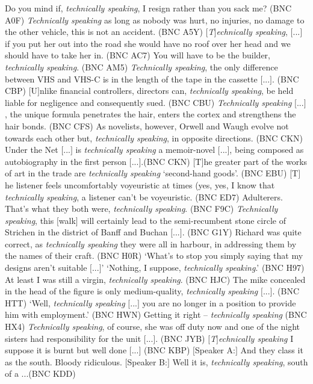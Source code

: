 \begin{exe}
\ex
\begin{xlist}
\label{ex:technicallyspeaking}
\ex Do you mind if, \textit{technically speaking}, I resign rather than you sack me? (BNC A0F) %
\ex \textit{Technically speaking} as long as nobody was hurt, no injuries, no damage to the other vehicle, this is not an accident. (BNC A5Y) %
\ex \textit{$[$T$]$echnically speaking}, $[$...$]$ if you put her out into the road she would have no roof over her head and we should have to take her in. \footnotesize{(BNC AC7)} %
\ex You will have to be the builder, \textit{technically speaking}. (BNC AM5) %
\ex \textit{Technically speaking}, the only difference between VHS and VHS-C is in the length of the tape in the cassette $[$...$]$. (BNC CBP) %
\ex $[$U$]$nlike financial controllers, directors can, \textit{technically speaking}, be held liable for negligence and consequently sued. (BNC CBU) %
\ex \textit{Technically speaking} $[$...$]$, the unique formula penetrates the hair, enters the cortex and strengthens the hair bonds. (BNC CFS) %
\ex As novelists, however, Orwell and Waugh evolve not towards each other but, \textit{technically speaking}, in opposite directions. (BNC CKN) %
\ex Under the Net $[$...$]$ is \textit{technically speaking} a memoir-novel $[$...$]$, being composed as autobiography in the first person $[$...$]$.(BNC CKN) %
\ex $[$T$]$he greater part of the works of art in the trade are \textit{technically speaking} `second-hand goods'. (BNC EBU) %
\ex $[$T$]$he listener feels uncomfortably voyeuristic at times (yes, yes, I know that \textit{technically speaking}, a listener can't be voyeuristic. (BNC ED7) %
\ex Adulterers. That's what they both were, \textit{technically speaking}. \footnotesize{(BNC F9C)} %
\ex \textit{Technically speaking}, this $[$walk$]$ will certainly lead to the semi\hyp{}recumbent stone circle of Strichen in the district of Banff and Buchan $[$...$]$. (BNC G1Y) %
\ex Richard was quite correct, as \textit{technically speaking} they were all in harbour, in addressing them by the names of their craft. (BNC H0R) %
\ex `What's to stop you simply saying that my designs aren't suitable $[$...$]$' `Nothing, I suppose, \textit{technically speaking}.' (BNC H97) %
\ex At least I was still a virgin, \textit{technically speaking}. (BNC HJC) %
\ex The mike concealed in the head of the figure is only medium-quality, \textit{technically speaking} $[$...$]$. (BNC HTT) %
\ex `Well, \textit{technically speaking} $[$...$]$ you are no longer in a position to provide him with employment.' (BNC HWN) %
\ex Getting it right -- \textit{technically speaking} (BNC HX4) %
\ex \textit{Technically speaking}, of course, she was off duty now and one of the night sisters had responsibility for the unit $[$...$]$. (BNC JYB) %
\ex \textit{$[$T$]$echnically speaking} I suppose it is burnt but well done $[$...$]$ \footnotesize{(BNC KBP)} %
\ex $[$Speaker A:$]$ And they class it as the south. Bloody ridiculous. $[$Speaker B:$]$ Well it is, \textit{technically speaking}, south of a ...(BNC KDD) %
\end{xlist}
\end{exe}


